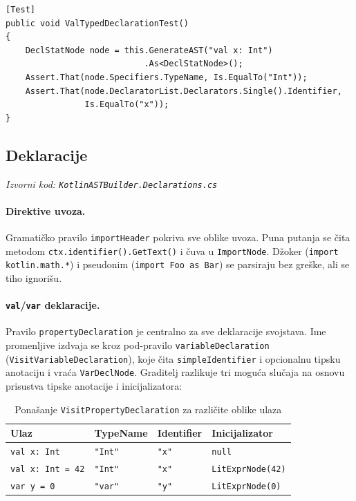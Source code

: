 \documentclass[a4paper]{article}
\begin{document}
\begin{lstlisting}[language=CSharp, caption={Primer unit testa za deklaraciju}]
[Test]
public void ValTypedDeclarationTest()
{
    DeclStatNode node = this.GenerateAST("val x: Int")
                            .As<DeclStatNode>();
    Assert.That(node.Specifiers.TypeName, Is.EqualTo("Int"));
    Assert.That(node.DeclaratorList.Declarators.Single().Identifier,
                Is.EqualTo("x"));
}
\end{lstlisting}

\subsection{Deklaracije}
\noindent\textit{Izvorni kod: \texttt{KotlinASTBuilder.Declarations.cs}}

\paragraph{Direktive uvoza.}
\begin{sloppypar}
Gramatičko pravilo \texttt{importHeader} pokriva sve oblike uvoza.
Puna putanja se čita metodom \texttt{ctx.identifier().GetText()} i
čuva u \texttt{ImportNode}. Džoker (\texttt{import kotlin.math.*})
i pseudonim (\texttt{import Foo as Bar}) se parsiraju bez greške,
ali se tiho ignorišu.
\end{sloppypar}

\paragraph{\texttt{val}/\texttt{var} deklaracije.}
Pravilo \texttt{propertyDeclaration} je centralno za sve deklaracije svojstava.
Ime promenljive izdvaja se kroz pod-pravilo \texttt{variableDeclaration}
(\texttt{VisitVariableDeclaration}), koje čita \texttt{simpleIdentifier} i
opcionalnu tipsku anotaciju i vraća \texttt{VarDeclNode}.
Graditelj razlikuje tri moguća slučaja na osnovu prisustva tipske anotacije i
inicijalizatora:

\begin{table}[H]
\centering
\begin{tabularx}{\textwidth}{lllX}
\toprule
\textbf{Ulaz} & \textbf{TypeName} & \textbf{Identifier} & \textbf{Inicijalizator} \\
\midrule
\texttt{val x: Int}      & \texttt{"Int"}    & \texttt{"x"} & \texttt{null} \\
\texttt{val x: Int = 42} & \texttt{"Int"}    & \texttt{"x"} & \texttt{LitExprNode(42)} \\
\texttt{var y = 0}       & \texttt{"var"}    & \texttt{"y"} & \texttt{LitExprNode(0)} \\
\bottomrule
\end{tabularx}
\caption{Ponašanje \texttt{VisitPropertyDeclaration} za različite oblike ulaza}
\end{table}
\end{document}
